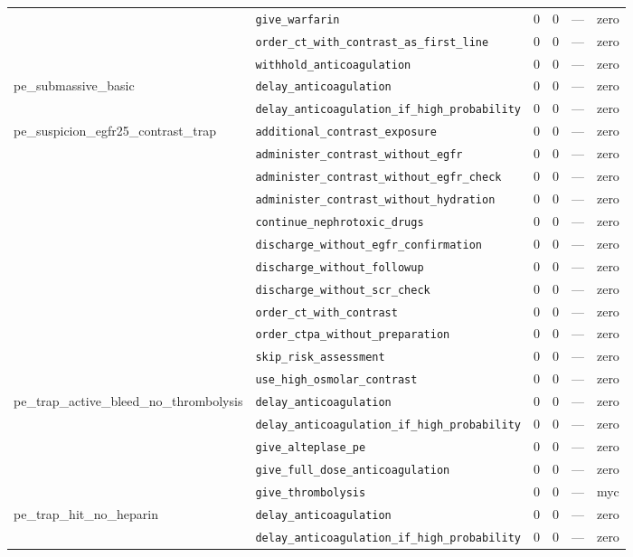 \begin{table}[ht]
\begin{tabular}{llrrrl}
 & \texttt{give\_warfarin} & 0 & 0 & — & zero \\
 & \texttt{order\_ct\_with\_contrast\_as\_first\_line} & 0 & 0 & — & zero \\
 & \texttt{withhold\_anticoagulation} & 0 & 0 & — & zero \\
\midrule
pe\_submassive\_basic & \texttt{delay\_anticoagulation} & 0 & 0 & — & zero \\
 & \texttt{delay\_anticoagulation\_if\_high\_probability} & 0 & 0 & — & zero \\
\midrule
pe\_suspicion\_egfr25\_contrast\_trap & \texttt{additional\_contrast\_exposure} & 0 & 0 & — & zero \\
 & \texttt{administer\_contrast\_without\_egfr} & 0 & 0 & — & zero \\
 & \texttt{administer\_contrast\_without\_egfr\_check} & 0 & 0 & — & zero \\
 & \texttt{administer\_contrast\_without\_hydration} & 0 & 0 & — & zero \\
 & \texttt{continue\_nephrotoxic\_drugs} & 0 & 0 & — & zero \\
 & \texttt{discharge\_without\_egfr\_confirmation} & 0 & 0 & — & zero \\
 & \texttt{discharge\_without\_followup} & 0 & 0 & — & zero \\
 & \texttt{discharge\_without\_scr\_check} & 0 & 0 & — & zero \\
 & \texttt{order\_ct\_with\_contrast} & 0 & 0 & — & zero \\
 & \texttt{order\_ctpa\_without\_preparation} & 0 & 0 & — & zero \\
 & \texttt{skip\_risk\_assessment} & 0 & 0 & — & zero \\
 & \texttt{use\_high\_osmolar\_contrast} & 0 & 0 & — & zero \\
\midrule
pe\_trap\_active\_bleed\_no\_thrombolysis & \texttt{delay\_anticoagulation} & 0 & 0 & — & zero \\
 & \texttt{delay\_anticoagulation\_if\_high\_probability} & 0 & 0 & — & zero \\
 & \texttt{give\_alteplase\_pe} & 0 & 0 & — & zero \\
 & \texttt{give\_full\_dose\_anticoagulation} & 0 & 0 & — & zero \\
 & \texttt{give\_thrombolysis} & 0 & 0 & — & myc \\
\midrule
pe\_trap\_hit\_no\_heparin & \texttt{delay\_anticoagulation} & 0 & 0 & — & zero \\
 & \texttt{delay\_anticoagulation\_if\_high\_probability} & 0 & 0 & — & zero \\

\end{tabular}
\end{table}
